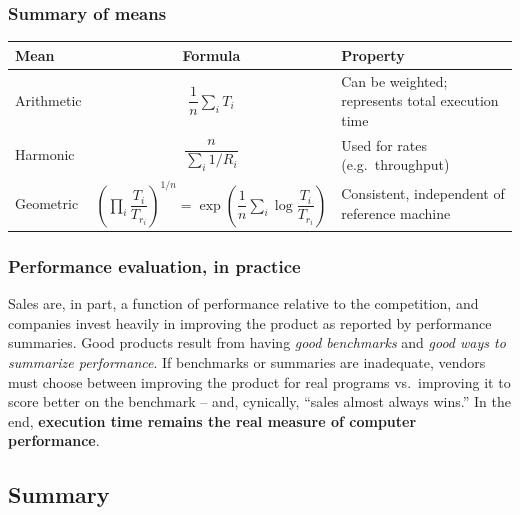 \subsubsection{Summary of means}
\begin{center}
\begin{tabular}{@{}lcp{4.6cm}@{}}
\toprule
Mean & Formula & Property \\
\midrule
Arithmetic & $\dfrac{1}{n}\sum_i T_i$ & Can be weighted; represents total execution time \\
Harmonic   & $\dfrac{n}{\sum_i 1/R_i}$ & Used for rates (e.g.\ throughput) \\
Geometric  & $\left(\prod_i \dfrac{T_i}{T_{r_i}}\right)^{1/n} =
\exp\!\left(\dfrac{1}{n}\sum_i \log\dfrac{T_i}{T_{r_i}}\right)$ &
Consistent, independent of reference machine \\
\bottomrule
\end{tabular}
\end{center}

\subsubsection{Performance evaluation, in practice}
Sales are, in part, a function of performance relative to the competition,
and companies invest heavily in improving the product as reported by
performance summaries. Good products result from having \emph{good
benchmarks} and \emph{good ways to summarize performance}. If benchmarks or
summaries are inadequate, vendors must choose between improving the product
for real programs vs.\ improving it to score better on the benchmark --
and, cynically, ``sales almost always wins.'' In the end,
\textbf{execution time remains the real measure of computer performance}.

\subsection{Summary}

